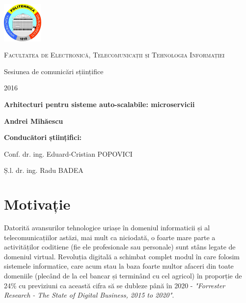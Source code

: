 \documentclass[12pt, a4paper, oneside, romanian]{teza-upb}
\begin{document}
\begin{titlepage}
	\centering
	\includegraphics[width=0.15\textwidth]{img/UPB-logo.png}\par\vspace{1cm}
	{\scshape\LARGE Facultatea de Electronică, Telecomunicații și Tehnologia Informației \par}
	\vspace{1cm}
	{\huge Sesiunea de comunicări sțiințifice\par}
	{\large 2016 \par}
	\vspace{1cm}
	{\huge\bfseries Arhitecturi pentru sisteme auto-scalabile: microservicii\par}
	\vspace{2cm}
	{\Large\bfseries Andrei Mihăescu\par}
	\vspace{2cm}
	{\Large\bfseries Conducători științifici: \par}
	{\Large Conf. dr. ing. Eduard-Cristian POPOVICI \par}
	{\Large Ș.l. dr. ing. Radu BADEA\par}
\end{titlepage}
\newpage

\chapter{Motivație}

Datorită avansurilor tehnologice uriașe în domeniul informaticii și al telecomunicațiilor astăzi, mai mult ca niciodată, o foarte mare parte a activităților coditiene (fie ele profesionale sau personale) sunt stâns legate de domeniul virtual. Revoluția digitală a schimbat complet modul în care folosim sistemele informatice, care acum stau la baza foarte multor afaceri din toate domeniile (plecând de la cel bancar și terminând cu cel agricol) în proporție de 24\% cu previziuni ca această cifra să se dubleze până în 2020 - \textit{"Forrester Research - The State of Digital Business, 2015 to 2020"}.
\end{document}
